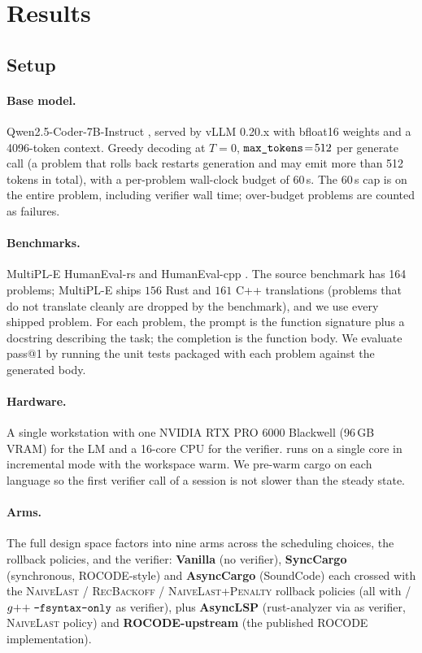 \section{Results}\label{sec:results}

\subsection{Setup}\label{sec:setup}

\paragraph{Base model.}
Qwen2.5-Coder-7B-Instruct \citep{hui2024qwen25coder}, served by
vLLM 0.20.x with bfloat16 weights and a 4096-token context. Greedy
decoding at $T\!=\!0$, $\texttt{max\_tokens}\!=\!512$ per generate
call (a problem that rolls back restarts generation and may emit
more than 512 tokens in total), with a per-problem
wall-clock budget of $60$\,s. The 60\,s cap is on the entire
problem, including verifier wall time; over-budget problems are
counted as failures.

\paragraph{Benchmarks.}
MultiPL-E HumanEval-rs and HumanEval-cpp
\citep{cassano2022multipl,chen2021humaneval}. The source benchmark
has 164 problems; MultiPL-E ships $156$ Rust and $161$ C++
translations (problems that do not translate cleanly are dropped by
the benchmark), and we use every shipped problem.
For each problem, the prompt is the function signature plus a
docstring describing the task; the completion is the function body.
We evaluate pass@1 by running the unit tests packaged with each
problem against the generated body.

\paragraph{Hardware.}
A single workstation with one NVIDIA RTX PRO 6000 Blackwell
(96\,GB VRAM) for the LM and a 16-core CPU for the verifier.
 runs on a single core in incremental mode with
the workspace warm. We pre-warm cargo on each language so the first
verifier call of a session is not slower than the steady state.

\paragraph{Arms.} The full design space factors into nine arms
across the scheduling choices, the rollback policies, and the
verifier: \textbf{Vanilla} (no verifier), \textbf{SyncCargo}
(synchronous, ROCODE-style) and \textbf{AsyncCargo} (SoundCode)
each crossed with the \textsc{NaiveLast} / \textsc{RecBackoff} /
\textsc{NaiveLast+Penalty} rollback policies (all with
 / $g{+}{+}\;\texttt{-fsyntax-only}$ as verifier),
plus \textbf{AsyncLSP} (rust-analyzer via  as
verifier, \textsc{NaiveLast} policy) and \textbf{ROCODE-upstream}
(the published ROCODE implementation).

